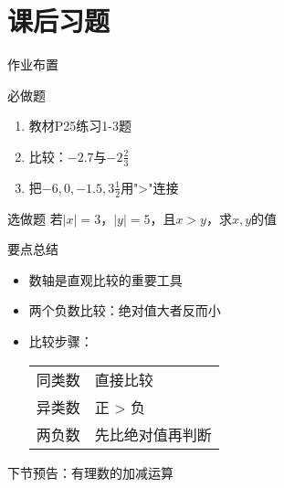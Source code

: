 \documentclass[aspectratio=169]{ctexbeamer}
\begin{document}
\section{课后习题}
\begin{frame}{作业布置}
    \begin{block}{必做题}
        \begin{enumerate}
            \item 教材P25练习1-3题
            \item 比较：$-2.7$与$-2\frac{2}{3}$
            \item 把$-6, 0, -1.5, 3\frac{1}{2}$用">"连接
        \end{enumerate}
    \end{block}
    
    \begin{block}{选做题}
        若$|x| = 3$，$|y| = 5$，且$x > y$，求$x,y$的值
    \end{block}
\end{frame}

\begin{frame}{要点总结}
    \begin{itemize}
        \item \alert{数轴}是直观比较的重要工具
        \item 两个负数比较：绝对值大者反而小
        \item 比较步骤：\\
        \begin{tabular}{ll}
            同类数 & 直接比较\\
            异类数 & 正 > 负\\
            两负数 & 先比绝对值再判断
        \end{tabular}
    \end{itemize}
    
    \vspace{1cm}
    \centering
    \alert{下节预告：有理数的加减运算}
\end{frame}
\end{document}
